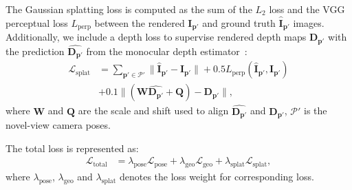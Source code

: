 The Gaussian splatting loss is computed as the sum of the $L_2$ loss and the VGG perceptual loss $L_\text{perp}$ between the rendered $\mathbf{I}_{\mathbf{p}'}$ and ground truth $\hat{\mathbf{I}}_{\mathbf{p}'}$ images. Additionally, we include a depth loss to supervise  rendered depth maps $\mathbf{D}_{\mathbf{p}'}$ with the prediction $\hat{\mathbf{D}_{\mathbf{p}'}}$ from the monocular depth estimator~\cite{depthanything}:
\begin{align}
    \mathcal{L}_{\text{splat}} &= \sum_{\mathbf{p}' \in \mathcal{P}' }\|\hat{\mathbf{I}}_{\mathbf{p}'} - \mathbf{I}_{\mathbf{p}'}\| + 0.5L_\text{perp}(\hat{\mathbf{I}}_{\mathbf{p}'}, \mathbf{I}_{\mathbf{p}'}) \\
    &+ 0.1 \|(\mathbf{W}\hat{\mathbf{D}_{\mathbf{p}'}} + \mathbf{Q}) - \mathbf{D}_{\mathbf{p}'}\|, 
\end{align}
where $\mathbf{W}$ and $\mathbf{Q}$ are the scale and shift used to align  $\hat{\mathbf{D}_{\mathbf{p}'}}$ and $\mathbf{D}_{\mathbf{p}'}$, $\mathcal{P}'$ is the novel-view camera poses.

The total loss is represented as:
\begin{align}
    \mathcal{L}_{\text{total}} &= \lambda_{\text{pose}} \mathcal{L}_{\text{pose}} + \lambda_{\text{geo}} \mathcal{L}_{\text{geo}} + \lambda_{\text{splat}} \mathcal{L}_{\text{splat}},
\end{align}
where $\lambda_{\text{pose}}$,  $\lambda_{\text{geo}}$ and $\lambda_{\text{splat}}$ denotes the loss weight for corresponding loss.




